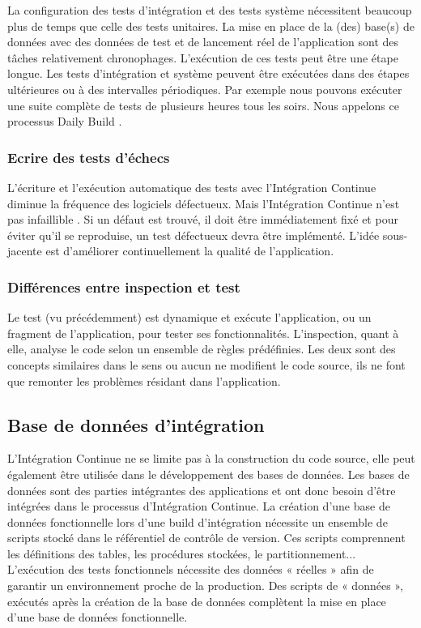       La configuration des tests d'intégration et des tests système nécessitent beaucoup plus de temps que celle des tests unitaires. La mise en place de la (des) base(s) de données avec des données de test et de lancement réel de l’application sont des tâches relativement chronophages. L’exécution de ces tests peut être une étape longue. Les tests d’intégration et système peuvent être exécutées dans des étapes ultérieures ou à des intervalles périodiques. Par exemple nous pouvons exécuter une suite complète de tests de plusieurs heures tous les soirs. Nous appelons ce processus Daily Build \cite{McC96}.

      \subsubsection{Ecrire des tests d’échecs}
      L’écriture et l’exécution automatique des tests avec l’Intégration Continue diminue la fréquence des logiciels défectueux. Mais l’Intégration Continue n’est pas infaillible \cite{Duv07}. Si un défaut est trouvé, il doit être immédiatement fixé et pour éviter qu'il se reproduise, un test défectueux devra être implémenté. L'idée sous-jacente est d’améliorer continuellement la qualité de l’application.

      \subsubsection{Différences entre inspection et test}
      Le test (vu précédemment) est dynamique et exécute l’application, ou un fragment de l’application, pour tester ses fonctionnalités. L’inspection, quant à elle, analyse le code selon un ensemble de règles prédéfinies. Les deux sont des concepts similaires dans le sens ou aucun ne modifient le code source, ils ne font que remonter les problèmes résidant dans l’application.

    \subsection{Base de données d’intégration}
    L’Intégration Continue ne se limite pas à la construction du code source, elle peut également être utilisée dans le développement des bases de données. Les bases de données sont des parties intégrantes des applications et ont donc besoin d’être intégrées dans le processus d’Intégration Continue. La création d’une base de données fonctionnelle lors d’une build d’intégration nécessite un ensemble de scripts stocké dans le référentiel de contrôle de version. Ces scripts comprennent les définitions des tables, les procédures stockées, le partitionnement... L’exécution des tests fonctionnels nécessite des données « réelles » afin de garantir un environnement proche de la production. Des scripts de « données », exécutés après la création de la base de données complètent la mise en place d’une base de données fonctionnelle.\\

